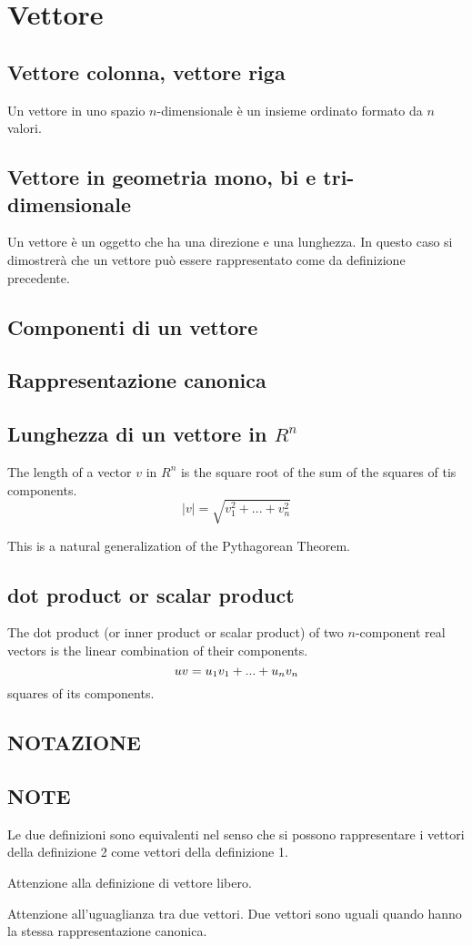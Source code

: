 \section{Vettore}
\subsection{Vettore colonna, vettore riga}
Un vettore in uno spazio $n$-dimensionale è un insieme ordinato formato da $n$ valori. 

\subsection{Vettore in geometria mono, bi e tri-dimensionale}
Un vettore è un oggetto che ha una direzione e una lunghezza. In questo caso si dimostrerà che un vettore può essere
rappresentato come da definizione precedente.

\subsection{Componenti di un vettore}

\subsection{Rappresentazione canonica}

\subsection{Lunghezza di un vettore in $R^n$}
The length of a vector $v$ in $R^n$ is the square root of the sum of the squares of tis components.
\[
 |v|=\sqrt{v^2_1+...+v^2_n}
\]

This is a natural generalization of the Pythagorean Theorem.

\subsection{dot product or scalar product}
The dot product (or inner product or scalar product) of two $n$-component real vectors is the linear combination of their components.
\[
 u \dotfill v = u_1v_1+...+u_nv_n
\]
squares of its components.


\subsection{NOTAZIONE}

\subsection{NOTE}
Le due definizioni sono equivalenti nel senso che si possono rappresentare i vettori della definizione 2 come vettori
della definizione 1.

Attenzione alla definizione di vettore libero.

Attenzione all'uguaglianza tra due vettori. Due vettori sono uguali quando hanno la stessa rappresentazione canonica.




